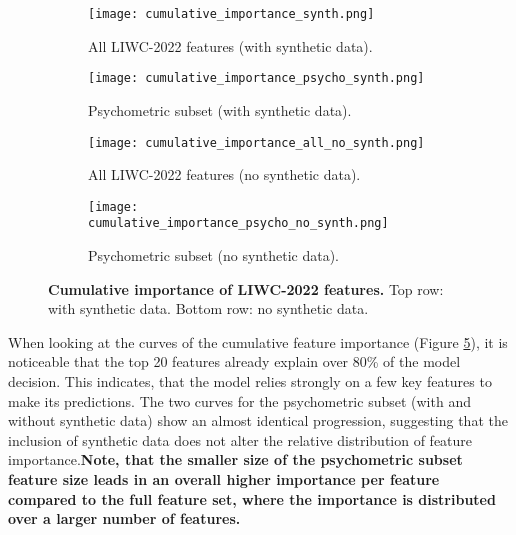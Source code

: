 \begin{figure}[H]
  \centering
  
  \begin{subfigure}[t]{0.49\textwidth}
    \centering
    \texttt{[image: cumulative\_importance\_synth.png]}
    \caption{All LIWC-2022 features (with synthetic data).}
    \label{fig:cum_synth_all}
  \end{subfigure}\hfill
  \begin{subfigure}[t]{0.49\textwidth}
    \centering
    \texttt{[image: cumulative\_importance\_psycho\_synth.png]}
    \caption{Psychometric subset (with synthetic data).}
    \label{fig:cum_synth_psycho}
  \end{subfigure}
  
  \vspace{0.5cm}
  
  \begin{subfigure}[t]{0.49\textwidth}
    \centering
    \texttt{[image: cumulative\_importance\_all\_no\_synth.png]}
    \caption{All LIWC-2022 features (no synthetic data).}
    \label{fig:cum_no_synth_all}
  \end{subfigure}\hfill
  \begin{subfigure}[t]{0.49\textwidth}
    \centering
    \texttt{[image: cumulative\_importance\_psycho\_no\_synth.png]}
    \caption{Psychometric subset (no synthetic data).}
    \label{fig:cum_no_synth_psycho}
  \end{subfigure}

  \caption[Cumulative importance of LIWC-2022 features.]{\textbf{Cumulative importance of LIWC-2022 features.} 
  Top row: with synthetic data. Bottom row: no synthetic data.}
  \label{fig:cumulative_feature_importance_combined}
\end{figure}

When looking at the curves of the cumulative feature importance (Figure \ref{fig:cumulative_feature_importance_combined}), it is noticeable that the top 20 features already explain over 80\% of the model decision. This indicates, that the model relies strongly on a few key features to make its predictions. The two curves for the psychometric subset (with and without synthetic data) show an almost identical progression, suggesting that the inclusion of synthetic data does not alter the relative distribution of feature importance.\textbf{Note, that the smaller size of the psychometric subset feature size leads in an overall higher importance per feature compared to the full feature set, where the importance is distributed over a larger number of features.}


